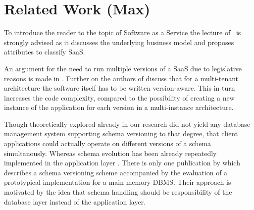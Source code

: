 \section{Related Work (Max)}
\label{sec:relatedwork}

To introduce the reader to the topic of Software as a Service the lecture of~\cite{Chong2006a} is strongly advised as it discusses the underlying business model and proposes attributes to classify SaaS.

An argument for the need to run multiple versions of a SaaS due to legislative reasons is made in \cite{Bezemer2010}.
Further on the authors of \cite{Bezemer2010} discuss that for a multi-tenant architecture the software itself has to be written version-aware.
This in turn increases the code complexity, compared to the possibility of creating a new instance of the application for each version in a multi-instance architecture.

Though theoretically explored already in \cite{roddick1995survey} our research did not yield any database management system supporting schema versioning to that degree, that client applications could actually operate on different versions of a schema simultanously.
Whereas schema evolution has been already repeatedly implemented in the application layer \cite{Weissman2009} \cite{Keddo}.
There is only one publication by \cite{Aulbach2011} which describes a schema versioning scheme accompanied by the evaluation of a prototypical implementation for a main-memory DBMS. Their approach is motivated by the idea that schema handling should be responsibility of the database layer instead of the application layer.

